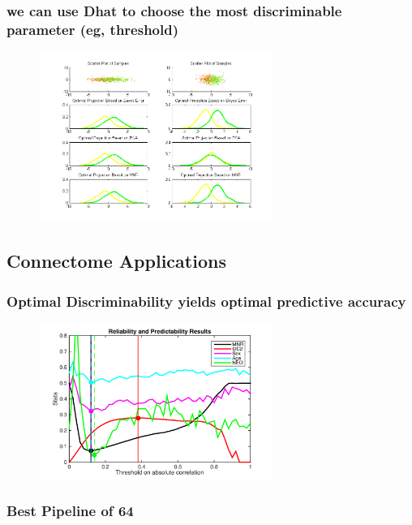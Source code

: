 \documentclass{article}
\begin{document}
\subsubsection{we can use Dhat to choose the most discriminable parameter (eg, threshold)}


\begin{figure}[t!]
\includegraphics[width=3.0in]{../Figs/parameter_selection_2sub.png}
\caption{}
\label{fig:64}
\end{figure}




\subsection{Connectome Applications}

\subsubsection{Optimal Discriminability yields optimal predictive accuracy}

\begin{figure}[t!]
\includegraphics[width=3.0in]{../Figs/HCP.png}
\caption{}
\label{fig:64}
\end{figure}


\subsubsection{Best Pipeline of 64}
\end{document}
